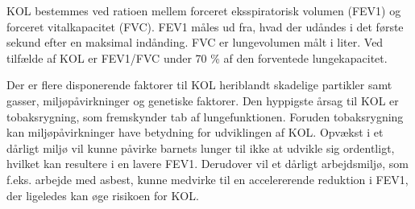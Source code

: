 KOL bestemmes ved ratioen mellem forceret eksspiratorisk volumen (FEV1) og forceret vitalkapacitet (FVC). FEV1 måles ud fra, hvad der udåndes i det første sekund efter en maksimal indånding. FVC er lungevolumen målt i liter. Ved tilfælde af KOL er FEV1/FVC under 70 \% af den forventede lungekapacitet.\cite{Basisbogen2016}

Der er flere disponerende faktorer til KOL heriblandt skadelige partikler samt gasser, miljøpåvirkninger og genetiske faktorer. Den hyppigste årsag til KOL er tobaksrygning, som fremskynder tab af lungefunktionen.\cite{dsam2016,Basisbogen2016,Martinez2016} Foruden tobaksrygning kan miljøpåvirkninger have betydning for udviklingen af KOL. Opvækst i et dårligt miljø vil kunne påvirke barnets lunger til ikke at udvikle sig ordentligt, hvilket kan resultere i en lavere FEV1. Derudover vil et dårligt arbejdsmiljø, som f.eks. arbejde med asbest, kunne medvirke til en accelererende reduktion i FEV1, der ligeledes kan øge risikoen for KOL.\cite{Martinez2016} 
